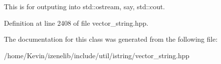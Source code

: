 This is for outputing into std::ostream, say, std::cout. 

Definition at line 2408 of file vector\_\-string.hpp.

The documentation for this class was generated from the following file:\begin{CompactItemize}
\item 
/home/Kevin/izenelib/include/util/istring/vector\_\-string.hpp\end{CompactItemize}
